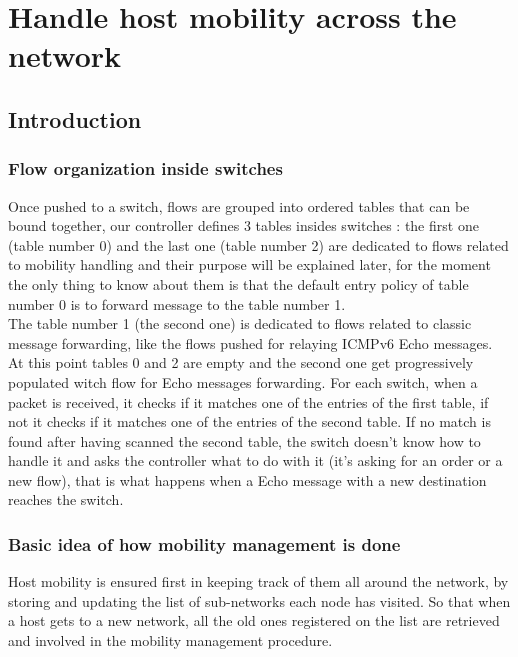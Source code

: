 \documentclass{article}
\begin{document}
\section{Handle host mobility across the network}

\subsection{Introduction}

\subsubsection{Flow organization inside switches}
Once pushed to a switch, flows are grouped into ordered tables that
can be bound together, our controller defines 3 tables insides
switches : the first one (table number 0) and the last one (table
number 2) are dedicated to flows related to mobility handling and
their purpose will be explained later, for the moment the only thing
to know about them is that the default entry policy of table number 0
is to forward message to the table number 1.\\
\newline
The table number 1 (the second one) is dedicated to flows related to
classic message forwarding, like the flows pushed for relaying ICMPv6
Echo messages. At this point tables 0 and 2 are empty and the second
one get progressively populated witch flow for Echo messages
forwarding. For each switch, when a packet is received, it checks if
it matches one of the entries of the first table, if not it checks if
it matches one of the entries of the second table. If no match is
found after having scanned the second table, the switch doesn't know
how to handle it and asks the controller what to do with it (it's
asking for an order or a new flow), that is what happens when a Echo
message with a new destination reaches the switch.

\subsubsection{Basic idea of how mobility management is done}

Host mobility is ensured first in keeping track of them all around the
network, by storing and updating the list of sub-networks each node
has visited. So that when a host gets to a new network, all the old
ones registered on the list are retrieved and involved in the mobility
management procedure.
\end{document}
